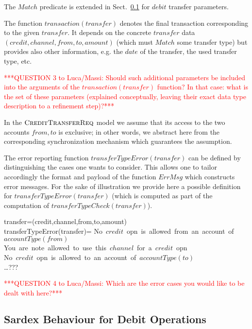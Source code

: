 The $Match$ predicate is extended in Sect.~\ref{sec:debitop} for $debit$ transfer parameters.

The function $transaction(transfer)$ denotes the final transaction corresponding to the given $transfer$. It depends on the concrete $transfer$ data $(credit,channel,from,to,amount)$ (which must $Match$ some transfer type) but provides also other information, e.g. the $date$ of the transfer, the used transfer type, etc.

\vspace{12pt}
\textcolor{red}{***QUESTION 3 to Luca/Massi: Should such additional parameters be included
	into the arguments of the $transaction(transfer)$ function? In that case: what is the set of these parameters (explained conceptually, leaving their exact data type description to a refinement step)?***}
\vspace{12pt}

In the $\hbox{\sc CreditTransferReq}$ model we assume that its access to the two accounts $from, to$ is exclusive; in other words, we abstract here from the corresponding synchronization mechanism which guarantees the assumption.

The error reporting function $transferTypeError(transfer)$ can be defined by distinguishing the cases one wants to consider. This allows one to tailor accordingly the format and payload of the function  $ErrMsg$ which constructs error messages. For the sake of illustration we provide here a possible definition for  $transferTypeError(transfer)$ (which is computed as part of the computation of $transferTypeCheck(transfer)$).

\begin{asm}
\LET transfer=(credit,channel,from,to,amount) \\
transferTypeError(transfer)=\+
  \mbox{No $credit$ opn is allowed from an account of $accountType(from)$}\\ 
  \OR \mbox{You are note allowed to use this $channel$ for a $credit$ opn}\\
  \OR \mbox{No $credit$ opn is allowed to an account of $accountType(to)$}\\
    \OR \ldots ???
\end{asm}
\vspace{12pt}
\textcolor{red}{***QUESTION 4 to Luca/Massi: Which are the error cases you would like to be dealt with here?***}
\vspace{12pt}


\subsection{Sardex Behaviour for Debit Operations}
\label{sec:debitop}


